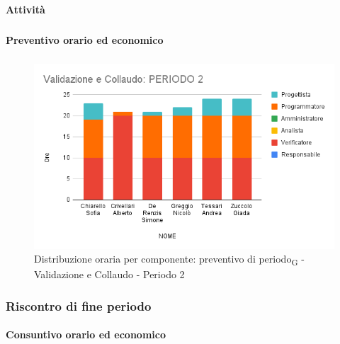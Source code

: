\paragraph{Attività}
\subparagraph*{}

\planningTable{
	
}



\paragraph{Preventivo orario ed economico}
\subparagraph*{}

\contabilitaTable{
	
}

\begin{figure}[H]
	\centering
	\includegraphics[scale=0.6]{res/images/charts/preventivo/valid_2.png}
	\caption{Distribuzione oraria per componente: preventivo di periodo\textsubscript{G} - Validazione e Collaudo - Periodo 2}
\end{figure}



\subsubsection{Riscontro di fine periodo}


\paragraph{Consuntivo orario ed economico}
\subparagraph*{}

\contabilitaTable{
	
}

